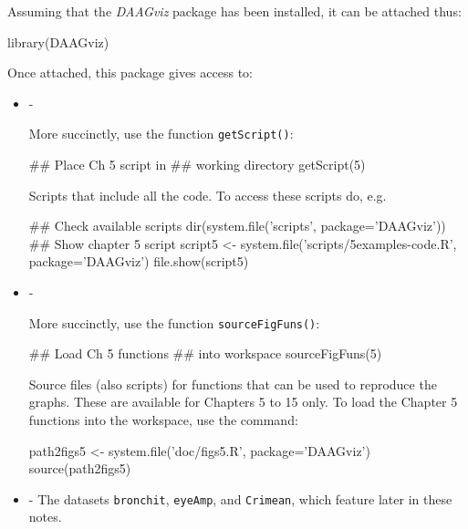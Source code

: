 \documentclass{tufte-book}\usepackage[]{graphicx}\usepackage[]{color}
\newcommand{\txtt}[1]{\texttt{#1}}
\newcommand{\margtt}[1]{{\footnotesize \texttt{#1}}}
\newenvironment{itemizz}%
  {\begin{itemize} %
    \setlength{\itemsep}{2pt}%
    \setlength{\parskip}{2pt}} %
  {\end{itemize}}
\begin{document}
\begin{marginfigure}Assuming that the {\em DAAGviz} package has been installed, it can be attached thus:
\begin{Schunk}
\begin{Sinput}
library(DAAGviz)
\end{Sinput}
\end{Schunk}
\end{marginfigure}
Once attached, this package gives access to:
\begin{itemizz}
\item[-]
\begin{marginfigure}[78pt]
More succinctly, use the function \margtt{getScript()}:\\[-3pt]
\begin{Schunk}
\begin{Sinput}
## Place Ch 5 script in
## working directory
getScript(5)
\end{Sinput}
\end{Schunk}
\end{marginfigure}
Scripts that include all the code. To access these scripts do, e.g.
\begin{Schunk}
\begin{Sinput}
## Check available scripts
dir(system.file('scripts', package='DAAGviz'))
## Show chapter 5 script
script5 <- system.file('scripts/5examples-code.R',
                        package='DAAGviz')
file.show(script5)
\end{Sinput}
\end{Schunk}
\item[-]
\begin{marginfigure}[24pt]
More succinctly, use the function \margtt{sourceFigFuns()}:\\[-3pt]
\begin{Schunk}
\begin{Sinput}
## Load Ch 5 functions
## into workspace
sourceFigFuns(5)
\end{Sinput}
\end{Schunk}
\end{marginfigure}
Source files (also scripts) for functions that can be used to
  reproduce the graphs. These are available for Chapters 5 to 15
only.  To load the Chapter 5 functions into the workspace,
use the command:
\begin{Schunk}
\begin{Sinput}
path2figs5 <- system.file('doc/figs5.R',
                          package='DAAGviz')
source(path2figs5)
\end{Sinput}
\end{Schunk}
\item[-] The datasets \txtt{bronchit}, \txtt{eyeAmp}, and
  \txtt{Crimean}, which feature later in these notes.
\end{itemizz}
\newpage
\end{document}
